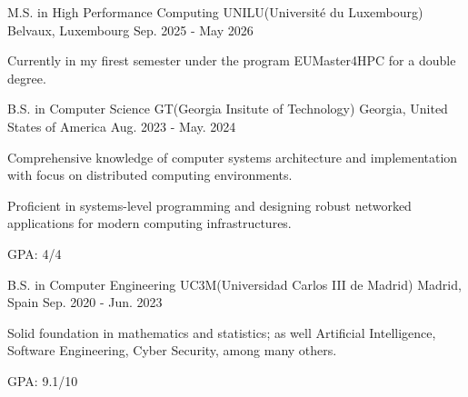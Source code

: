 

\begin{cventries}

  \cventry
    {M.S. in High Performance Computing} %
    {UNILU(Université du Luxembourg)} %
    {Belvaux, Luxembourg} %
    {Sep. 2025 - May 2026} %
    {
      \begin{cvitems} %
        \item {Currently in my firest semester under the program EUMaster4HPC for a double degree.}
      \end{cvitems}
    }

  \cventry
    {B.S. in Computer Science} %
    {GT(Georgia Insitute of Technology)} %
    {Georgia, United States of America} %
    {Aug. 2023 - May. 2024} %
    {
      \begin{cvitems} %
        \item {Comprehensive knowledge of computer systems architecture and implementation with focus on distributed computing environments.}
        \item {Proficient in systems-level programming and designing robust networked applications for modern computing infrastructures.}
        \item {GPA: 4/4}
      \end{cvitems}
    }
  \cventry
    {B.S. in Computer Engineering} %
    {UC3M(Universidad Carlos III de Madrid)} %
    {Madrid, Spain} %
    {Sep. 2020 - Jun. 2023} %
    {
      \begin{cvitems} %
        \item {Solid foundation in mathematics and statistics; as well Artificial Intelligence, Software Engineering, Cyber Security, among many others.}
        \item {GPA: 9.1/10}
      \end{cvitems}
    }


\end{cventries}
